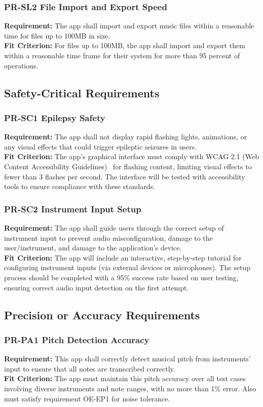 \documentclass[12pt]{article}
\begin{document}
\subsubsection*{PR-SL2 File Import and Export Speed}
\textbf{Requirement:} The app shall import and export music files within a reasonable time for files up to 100MB in size.\\
\textbf{Fit Criterion:} For files up to 100MB, the app shall import and export them within a reasonable time frame for their system for more than 95 percent of operations.

\subsection{Safety-Critical Requirements}
\subsubsection*{PR-SC1 Epilepsy Safety}
\textbf{Requirement:} The app shall not display rapid flashing lights, animations, or any visual effects that could trigger epileptic seizures in users.\\
\textbf{Fit Criterion:} The app’s graphical interface must comply with WCAG 2.1 (Web Content Accessibility Guidelines)~\cite{WCAG-Seizures} for flashing content, limiting visual effects to fewer than 3 flashes per second. The interface will be tested with accessibility tools to ensure compliance with these standards.
\subsubsection*{PR-SC2 Instrument Input Setup}
\textbf{Requirement:} The app shall guide users through the correct setup of instrument input to prevent audio misconfiguration, damage to the user/instrument, and damage to the application’s device.\\
\textbf{Fit Criterion:} The app will include an interactive, step-by-step tutorial for configuring instrument inputs (via external devices or microphones). The setup process should be completed with a 95\% success rate based on user testing, ensuring correct audio input detection on the first attempt.

\subsection{Precision or Accuracy Requirements}
\subsubsection*{PR-PA1 Pitch Detection Accuracy}
\textbf{Requirement:} This app shall correctly detect musical pitch from instruments' input to ensure that all notes are transcribed correctly.\\
\textbf{Fit Criterion:} The app must maintain this pitch accuracy over all test cases involving diverse instruments and note ranges, with no more than 1\% error. Also must satisfy requirement OE-EP1 for noise tolerance.
\end{document}
